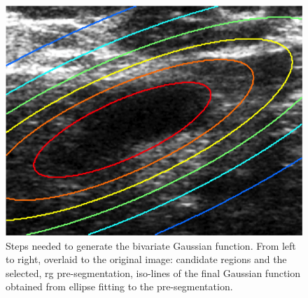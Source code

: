\begin{frame}
\begin{figure}[Htbp]
\includegraphics[trim= 0 5 0 10, clip,height=.24\textwidth]{mscThesis/gaussian.png}
\caption{ Steps needed to generate the bivariate Gaussian function. From left to right, overlaid to the original image: candidate regions and the selected, \ac{rg} pre-segmentation, iso-lines of the final Gaussian function obtained from ellipse fitting to the pre-segmentation.  }
\end{figure}

\end{frame}




